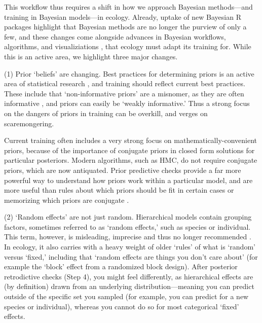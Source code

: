 \documentclass[11pt]{article}
\begin{document}
{This workflow thus requires a shift in how we approach Bayesian methods---and training in Bayesian models---in ecology. Already, uptake of new Bayesian \textsf{R} packages highlight that Bayesian methods are no longer the purview of only a few, and these changes come alongside advances in Bayesian workflows, algorithms, and visualiziations \citep[e.g.][]{betanworkflow,vandeschoot2021,gabryvis}, that ecology must adapt its training for. While this is an active area, we highlight three major changes.

(1) Prior `beliefs' are changing. Best practices for determining priors is an active area of statistical research \citep{BDA,regotherstories,betanprior}, and training should reflect current best practices. These include that `non-informative priors' are a misnomer, as they are often informative  \citep{lemoine2019}, and priors can easily be `weakly informative.' Thus a strong focus on the dangers of priors in training can be overkill, and verges on scaremongering. %

Current training often includes a very strong focus on mathematically-convenient priors, because of the importance of conjugate priors in closed form solutions for particular posteriors. Modern algorithms, such as HMC, do not require conjugate priors, which are now antiquated. Prior predictive checks provide a far more powerful way to understand how priors work within a particular model, and are more useful than rules about which priors should be fit in certain cases or memorizing which priors are conjugate \citep{betanprior}. %

(2) `Random effects' are not just random. Hierarchical models contain grouping factors, sometimes referred to as `random effects,' such as species or individual. This term, however, is misleading, imprecise and thus no longer recommended \citep{gelmanhill}. In ecology, it also carries with a heavy weight of older `rules' of what is `random' versus `fixed,' including that `random effects are things you don't care about' (for example the `block' effect from a randomized block design). After posterior retrodictive checks (Step 4), you might feel differently, as hierarchical effects are (by definition) drawn from an underlying distribution---meaning you can predict outside of the specific set you sampled (for example, you can predict for a new species or individual), whereas you cannot do so for most categorical `fixed' effects.

}
\end{document}
